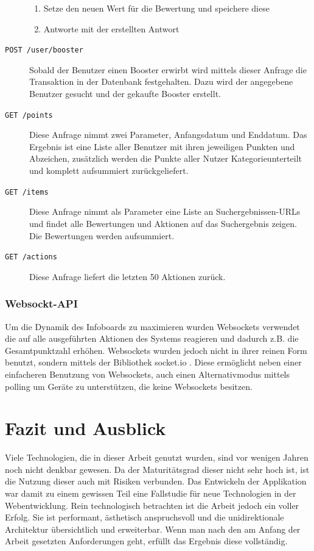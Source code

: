 \documentclass[12pt,twoside]{book}
\begin{document}
\begin{description}
\begin{enumerate}
		\item Setze den neuen Wert für die Bewertung und speichere diese
		\item Antworte mit der erstellten Antwort
	\end{enumerate}
	\item[\texttt{POST /user/booster}] Sobald der Benutzer einen Booster erwirbt wird mittels dieser Anfrage die Transaktion in der Datenbank festgehalten. Dazu wird der angegebene Benutzer gesucht und der gekaufte Booster erstellt.
	\item[\texttt{GET /points}] Diese Anfrage nimmt zwei Parameter, Anfangsdatum und Enddatum. Das Ergebnis ist eine Liste aller Benutzer mit ihren jeweiligen Punkten und Abzeichen, zusätzlich werden die Punkte aller Nutzer Kategorieunterteilt und komplett aufsummiert zurückgeliefert.
	\item[\texttt{GET /items}] Diese Anfrage nimmt als Parameter eine Liste an Suchergebnissen-URLs und findet alle Bewertungen und Aktionen auf das Suchergebnis zeigen. Die Bewertungen werden aufsummiert.
	\item[\texttt{GET /actions}] Diese Anfrage liefert die letzten 50 Aktionen zurück.

\end{description}

\subsection{Websockt-API}

Um die Dynamik des Infoboards zu maximieren wurden Websockets verwendet die auf alle ausgeführten Aktionen des Systems reagieren und dadurch z.B. die Gesamtpunktzahl erhöhen. Websockets wurden jedoch nicht in ihrer reinen Form benutzt, sondern mittels der Bibliothek socket.io \cite{rauch2013socket}. Diese ermöglicht neben einer einfacheren Benutzung von Websockets, auch einen Alternativmodus mittels polling um Geräte zu unterstützen, die keine Websockets besitzen.


\chapter{Fazit und Ausblick}

Viele Technologien, die in dieser Arbeit genutzt wurden, sind vor wenigen Jahren noch nicht denkbar gewesen. Da der Maturitätsgrad dieser nicht sehr hoch ist, ist die Nutzung dieser auch mit Risiken verbunden. Das Entwickeln der Applikation war damit zu einem gewissen Teil eine Fallstudie für neue Technologien in der Webentwicklung.
Rein technologisch betrachten ist die Arbeit jedoch ein voller Erfolg. Sie ist performant, ästhetisch anspruchsvoll und die unidirektionale Architektur übersichtlich und erweiterbar.
Wenn man nach den am Anfang der Arbeit gesetzten Anforderungen geht, erfüllt das Ergebnis diese vollständig.
\end{document}
